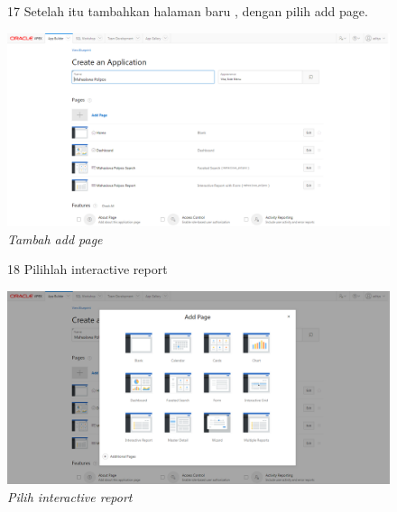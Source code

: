 \begin{enumerate}
\begin{figure}[!htbp]
\item[17] Setelah itu tambahkan halaman baru , dengan pilih add page.
	\begin{center}
	\includegraphics[scale=0.2]{figures/tahap19.png}
	\caption{\textit{Tambah add page}}
	\end{center}	 
\end{figure}

\begin{figure}[!htbp]
\item[18] Pilihlah interactive report
	\begin{center}
	\includegraphics[scale=0.2]{figures/tahap20.png}
	\caption{\textit{Pilih interactive report}}
	\end{center}	 
\end{figure}


\end{enumerate}
